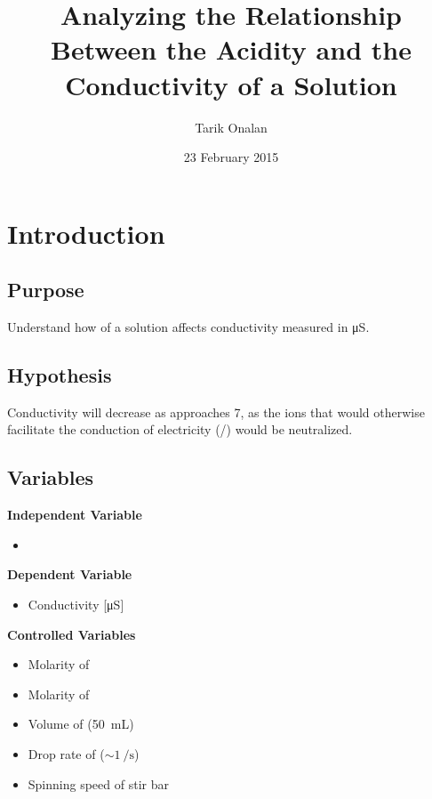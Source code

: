 \documentclass[a4paper]{article}
\title{Analyzing the Relationship Between the Acidity and the Conductivity of a Solution}
\date{23 February 2015}
\author{Tarik Onalan}
\newcommand{\pH}{\text{pH}}
\begin{document}
    \maketitle
    \section{Introduction}
        \subsection{Purpose}
            Understand how \pH{} of a solution affects conductivity measured in \si{\micro\siemens}.
        \subsection{Hypothesis}
            Conductivity will decrease as \pH{} approaches 7, as the ions that would
            otherwise facilitate the conduction of electricity (/)
            would be neutralized.
        \subsection{Variables}
            \textbf{Independent Variable}
            \begin{itemize}
                \item \pH{}
            \end{itemize}
            \textbf{Dependent Variable}
            \begin{itemize}
                \item Conductivity [\si{\micro\siemens}]
            \end{itemize}
            \textbf{Controlled Variables}
            \begin{itemize}
                \item Molarity of 
                \item Molarity of 
                \item Volume of  (\SI{50}{\mL})
                \item Drop rate of  ($\sim\SI{1}{\per\second}$)
                \item Spinning speed of stir bar
            \end{itemize}
\end{document}
